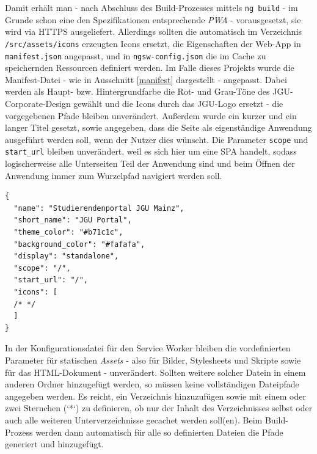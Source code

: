 Damit erhält man - nach Abschluss des Build-Prozesses mittels \texttt{ng build} - im Grunde schon eine den Spezifikationen entsprechende \textit{\acl{PWA}} - vorausgesetzt, sie wird via HTTPS ausgeliefert. Allerdings sollten die automatisch im Verzeichnis \texttt{/src/assets/icons} erzeugten Icons ersetzt, die Eigenschaften der Web-App in \texttt{manifest.json} angepasst, und in \texttt{ngsw-config.json} die im Cache zu speichernden Ressourcen definiert werden. Im Falle dieses Projekts wurde die Manifest-Datei - wie in Ausschnitt \ref{manifest} dargestellt - angepasst. Dabei werden als Haupt- bzw. Hintergrundfarbe die Rot- und Grau-Töne des JGU-Corporate-Design gewählt und die Icons durch das JGU-Logo ersetzt - die vorgegebenen Pfade bleiben unverändert. Außerdem wurde ein kurzer und ein langer Titel gesetzt, sowie angegeben, dass die Seite als eigenständige Anwendung ausgeführt werden soll, wenn der Nutzer dies wünscht. Die Parameter \texttt{scope} und \texttt{start\_url} bleiben unverändert, weil es sich hier um eine \acl{SPA} handelt, sodass logischerweise alle Unterseiten Teil der Anwendung sind und beim Öffnen der Anwendung immer zum Wurzelpfad navigiert werden soll.

\begin{lstlisting}[float, floatplacement=h, style=htmlcssjs, caption={Ausschnitt aus \texttt{manifest.json}}, label={manifest}]
{
  "name": "Studierendenportal JGU Mainz",
  "short_name": "JGU Portal",
  "theme_color": "#b71c1c",
  "background_color": "#fafafa",
  "display": "standalone",
  "scope": "/",
  "start_url": "/",
  "icons": [
  /* */
  ]
}
\end{lstlisting}
In der Konfigurationsdatei für den Service Worker bleiben die vordefinierten Parameter für statischen \textit{Assets} - also für Bilder, Stylesheets und Skripte sowie für das HTML-Dokument - unverändert. Sollten weitere solcher Datein in einem anderen Ordner hinzugefügt werden, so müssen keine vollständigen Dateipfade angegeben werden. Es reicht, ein Verzeichnis hinzuzufügen sowie mit einem oder zwei Sternchen (`*`) zu definieren, ob nur der Inhalt des Verzeichnisses selbst oder auch alle weiteren Unterverzeichnisse gecachet werden soll(en). Beim Build-Prozess werden dann automatisch für alle so definierten Dateien die Pfade generiert und hinzugefügt.

